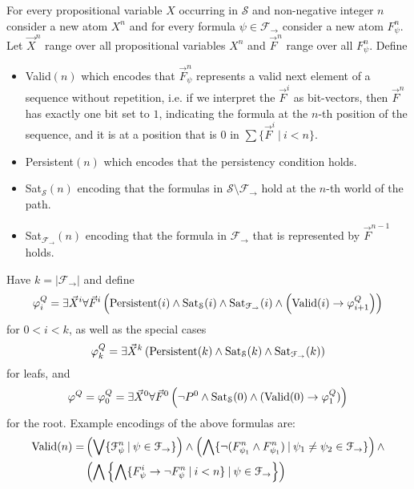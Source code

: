 \documentclass[a4paper,UKenglish,cleveref, autoref, thm-restate]{lipics-v2021}
\begin{document}
\begin{definition}
	For every propositional variable $X$ occurring in $\mathcal S$ and non-negative integer $n$ consider a new atom $X^n$ and for every formula $\psi\in\mathcal F_\to$ consider a new atom $F_\psi^n$. Let $\vec X^n$ range over all propositional variables $X^n$ and $\vec F^n$ range over all $F_\psi^n$. Define
	\begin{itemize}
		\item {\normalfont Valid}$(n)$ which encodes that $\vec F^n_\psi$ represents a valid next element of a sequence without repetition, i.e. if we interpret the $\vec F^i$ as bit-vectors, then $\vec F^n$ has exactly one bit set to $1$, indicating the formula at the $n$-th position of the sequence, and it is at a position that is $0$ in $\sum\{\vec F^i\:|\:i < n\}$.
		\item {\normalfont Persistent}$(n)$ which encodes that the persistency condition holds.
		\item {\normalfont Sat}$_{\mathcal S}(n)$ encoding that the formulas in $\mathcal S\setminus\mathcal F_\to$ hold at the $n$-th world of the path.
		\item {\normalfont Sat}$_{\mathcal F_\to}(n)$ encoding that the formula in $\mathcal F_\to$ that is represented by $\vec F^{n-1}$ holds.
	\end{itemize}
	Have $k = |\mathcal F_\to|$ and define$$\varphi^Q_{i} = \exists \vec X^i\forall \vec F^i\left(\text{\normalfont Persistent}(i)\wedge \text{\normalfont Sat}_{\mathcal S}(i)\wedge \text{\normalfont Sat}_{\mathcal F_\to}(i)\wedge\left(\text{\normalfont Valid}(i)\to \varphi^Q_{i+1}\right)\right)$$
	for $0 < i < k$, as well as the special cases
	$$\varphi^Q_{k} = \exists \vec X^k\left(\text{\normalfont Persistent}(k)\wedge \text{\normalfont Sat}_{\mathcal S}(k)\wedge \text{\normalfont Sat}_{\mathcal F_\to}(k)\right)$$
	for leafs, and $$\varphi^Q = \varphi_0^Q = \exists \vec X^0\forall \vec F^0\left(\neg P^0\wedge \text{\normalfont Sat}_{\mathcal S}(0)\wedge(\text{\normalfont Valid}(0)\to \varphi_1^Q)\right)$$for the root.
	Example encodings of the above formulas are:
	\begin{align*}
		\text{\normalfont Valid}(n) = &\left(\bigvee \{\mathcal F^n_\psi\:|\:\psi\in\mathcal F_\to\}\right)\wedge\left(\bigwedge \{\neg(F^n_{\psi_1}\wedge F^n_{\psi_1})\:|\:\psi_1\neq\psi_2\in\mathcal F_\to\}\right)\wedge\\&\left(\bigwedge\left\{\bigwedge\{F^i_\psi\to\neg F^n_\psi\:|\:i < n\}\:|\:\psi\in\mathcal F_\to\right\}\right)\\

\end{align*}
\end{definition}
\end{document}
